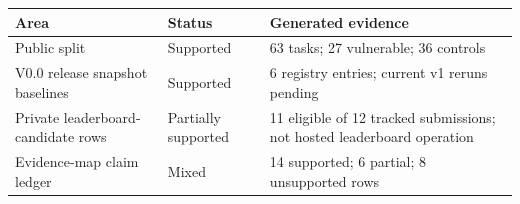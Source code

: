 \scriptsize
\begin{tabular}{@{}p{}p{}p{}@{}}
\toprule
Area & Status & Generated evidence \\
\midrule
Public split & Supported & 63 tasks; 27 vulnerable; 36 controls \\
V0.0 release snapshot baselines & Supported & 6 registry entries; current v1 reruns pending \\
Private leaderboard-candidate rows & Partially supported & 11 eligible of 12 tracked submissions; not hosted leaderboard operation \\
Evidence-map claim ledger & Mixed & 14 supported; 6 partial; 8 unsupported rows \\
\bottomrule
\end{tabular}
